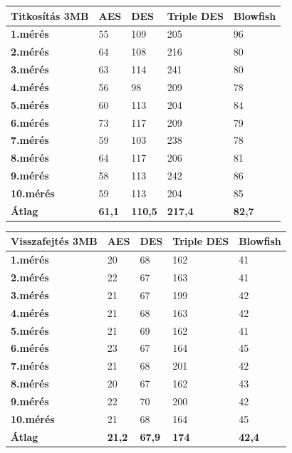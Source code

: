 \newpage
\begin{center}
	\begin{tabular}{|p{2.4cm}|p{2cm}|p{2cm}|p{2cm}|p{2cm}|}
		\hline
		\textbf{Titkosítás} \newline \textbf{3MB} & \textbf{AES} & \textbf{DES} & \textbf{Triple DES} & \textbf{Blowfish}\\
		\hline
		\textbf{1.mérés} & 55 & 109 & 205 & 96\\
		\hline
		\textbf{2.mérés} & 64 & 108 & 216 & 80\\
		\hline
		\textbf{3.mérés} & 63 & 114 & 241 & 80\\
		\hline
		\textbf{4.mérés} & 56 & 98 & 209 & 78\\
		\hline
		\textbf{5.mérés} & 60 & 113 & 204 & 84\\
		\hline
		\textbf{6.mérés} & 73 & 117 & 209 & 79\\
		\hline
		\textbf{7.mérés} & 59 & 103 & 238 & 78\\
		\hline
		\textbf{8.mérés} & 64 & 117 & 206 & 81\\
		\hline
		\textbf{9.mérés} & 58 & 113 & 242 & 86\\
		\hline
		\textbf{10.mérés} & 59 & 113 & 204 & 85\\
		\hline
		\hline
		\textbf{Átlag} & \textbf{61,1} & \textbf{110,5} & \textbf{217,4} & \textbf{82,7} \\
		\hline
	\end{tabular}
\end{center}

\begin{center}
	\begin{tabular}{|p{2.4cm}|p{2cm}|p{2cm}|p{2cm}|p{2cm}|}
		\hline
		\textbf{Visszafejtés} \newline \textbf{3MB} & \textbf{AES} & \textbf{DES} & \textbf{Triple DES} & \textbf{Blowfish}\\
		\hline
		\textbf{1.mérés} & 20 & 68 & 162 & 41\\
		\hline
		\textbf{2.mérés} & 22 & 67 & 163 & 41\\
		\hline
		\textbf{3.mérés} & 21 & 67 & 199 & 42\\
		\hline
		\textbf{4.mérés} & 21 & 68 & 163 & 42\\
		\hline
		\textbf{5.mérés} & 21 & 69 & 162 & 41\\
		\hline
		\textbf{6.mérés} & 23 & 67 & 164 & 45\\
		\hline
		\textbf{7.mérés} & 21 & 68 & 201 & 42\\
		\hline
		\textbf{8.mérés} & 20 & 67 & 162 & 43\\
		\hline
		\textbf{9.mérés} & 22 & 70 & 200 & 42\\
		\hline
		\textbf{10.mérés} & 21 & 68 & 164 & 45\\
		\hline
		\hline
		\textbf{Átlag} & \textbf{21,2} & \textbf{67,9} & \textbf{174} & \textbf{42,4}\\
		\hline
	\end{tabular}
\end{center}

